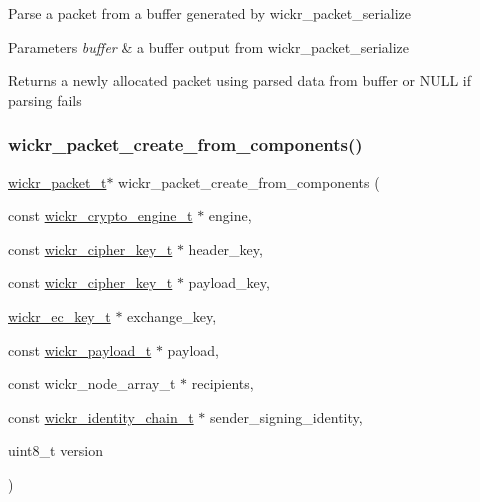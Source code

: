 Parse a packet from a buffer generated by \textquotesingle{}wickr\+\_\+packet\+\_\+serialize\textquotesingle{}


\begin{DoxyParams}{Parameters}
{\em buffer} & a buffer output from \textquotesingle{}wickr\+\_\+packet\+\_\+serialize\textquotesingle{} \\
\hline
\end{DoxyParams}
\begin{DoxyReturn}{Returns}
a newly allocated packet using parsed data from \textquotesingle{}buffer\textquotesingle{} or N\+U\+LL if parsing fails 
\end{DoxyReturn}
\mbox{\label{group__wickr__protocol_gaf34d8082df52a7ade2fea54eea65d342}} 
\subsubsection{\texorpdfstring{wickr\+\_\+packet\+\_\+create\+\_\+from\+\_\+components()}{wickr\_packet\_create\_from\_components()}}
{\footnotesize\ttfamily \mbox{\hyperlink{structwickr__packet}{wickr\+\_\+packet\+\_\+t}}$\ast$ wickr\+\_\+packet\+\_\+create\+\_\+from\+\_\+components (\begin{DoxyParamCaption}\item[{const \mbox{\hyperlink{structwickr__crypto__engine}{wickr\+\_\+crypto\+\_\+engine\+\_\+t}} $\ast$}]{engine,  }\item[{const \mbox{\hyperlink{structwickr__cipher__key}{wickr\+\_\+cipher\+\_\+key\+\_\+t}} $\ast$}]{header\+\_\+key,  }\item[{const \mbox{\hyperlink{structwickr__cipher__key}{wickr\+\_\+cipher\+\_\+key\+\_\+t}} $\ast$}]{payload\+\_\+key,  }\item[{\mbox{\hyperlink{structwickr__ec__key}{wickr\+\_\+ec\+\_\+key\+\_\+t}} $\ast$}]{exchange\+\_\+key,  }\item[{const \mbox{\hyperlink{structwickr__payload}{wickr\+\_\+payload\+\_\+t}} $\ast$}]{payload,  }\item[{const wickr\+\_\+node\+\_\+array\+\_\+t $\ast$}]{recipients,  }\item[{const \mbox{\hyperlink{structwickr__identity__chain}{wickr\+\_\+identity\+\_\+chain\+\_\+t}} $\ast$}]{sender\+\_\+signing\+\_\+identity,  }\item[{uint8\+\_\+t}]{version }\end{DoxyParamCaption})}

